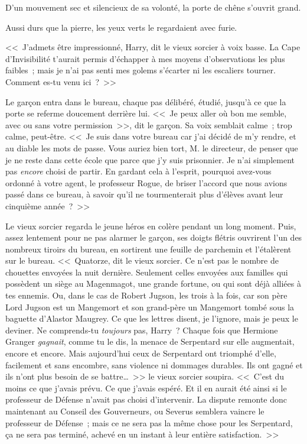 D'un mouvement sec et silencieux de sa volonté, la porte de chêne s'ouvrit grand.

Aussi durs que la pierre, les yeux verts le regardaient avec furie.

<<~J'admets être impressionné, Harry, dit le vieux sorcier à voix basse. La Cape d'Invisibilité t'aurait permis d'échapper à mes moyens d'observations les plus faibles~; mais je n'ai pas senti mes golems s'écarter ni les escaliers tourner. Comment es-tu venu ici~?~>>

Le garçon entra dans le bureau, chaque pas délibéré, étudié, jusqu'à ce que la porte se referme doucement derrière lui. <<~Je peux aller où bon me semble, avec ou sans votre permission~>>, dit le garçon. Sa voix semblait calme~; trop calme, peut-être. <<~Je suis dans votre bureau car j'ai décidé de m'y rendre, et au diable les mots de passe. Vous auriez bien tort, M. le directeur, de penser que je ne reste dans cette école que parce que j'y suis prisonnier. Je n'ai simplement pas \emph{encore} choisi de partir. En gardant cela à l'esprit, pourquoi avez-vous ordonné à votre agent, le professeur Rogue, de briser l'accord que nous avions passé dans ce bureau, à savoir qu'il ne tourmenterait plus d'élèves avant leur cinquième année~?~>>

Le vieux sorcier regarda le jeune héros en colère pendant un long moment. Puis, assez lentement pour ne pas alarmer le garçon, ses doigts flétris ouvrirent l'un des nombreux tiroirs du bureau, en sortirent une feuille de parchemin et l'étalèrent sur le bureau. <<~Quatorze, dit le vieux sorcier. Ce n'est pas le nombre de chouettes envoyées la nuit dernière. Seulement celles envoyées aux familles qui possèdent un siège au Magenmagot, une grande fortune, ou qui sont déjà alliées à tes ennemis. Ou, dans le cas de Robert Jugson, les trois à la fois, car son père Lord Jugson est un Mangemort et son grand-père un Mangemort tombé sous la baguette d'Alastor Maugrey. Ce que les lettres disent, je l'ignore, mais je peux le deviner. Ne comprends-tu \emph{toujours} pas, Harry~? Chaque fois que Hermione Granger \emph{gagnait}, comme tu le dis, la menace de Serpentard sur elle augmentait, encore et encore. Mais aujourd'hui ceux de Serpentard ont triomphé d'elle, facilement et sans encombre, sans violence ni dommages durables. Ils ont gagné et ils n'ont plus besoin de se battre…~>> le vieux sorcier soupira. <<~C'est du moins ce que j'avais prévu. Ce que j'avais espéré. Et il en aurait été ainsi si le professeur de Défense n'avait pas choisi d'intervenir. La dispute remonte donc maintenant au Conseil des Gouverneurs, ou Severus semblera vaincre le professeur de Défense~; mais ce ne sera pas la même chose pour les Serpentard, ça ne sera pas terminé, achevé en un instant à leur entière satisfaction.~>>


